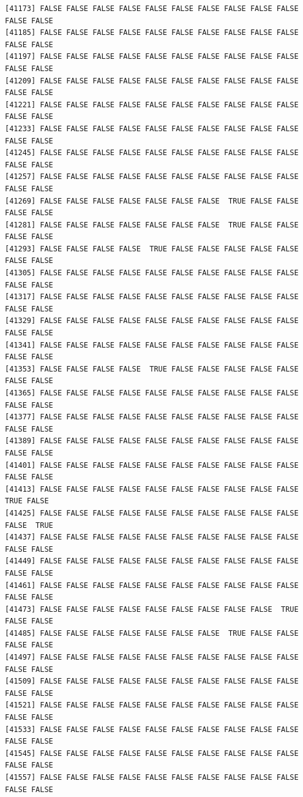 \documentclass[
  a4paper,
  DIV=11,
  numbers=noendperiod]{scrartcl}
\begin{document}
\begin{verbatim}
[41173] FALSE FALSE FALSE FALSE FALSE FALSE FALSE FALSE FALSE FALSE FALSE FALSE
[41185] FALSE FALSE FALSE FALSE FALSE FALSE FALSE FALSE FALSE FALSE FALSE FALSE
[41197] FALSE FALSE FALSE FALSE FALSE FALSE FALSE FALSE FALSE FALSE FALSE FALSE
[41209] FALSE FALSE FALSE FALSE FALSE FALSE FALSE FALSE FALSE FALSE FALSE FALSE
[41221] FALSE FALSE FALSE FALSE FALSE FALSE FALSE FALSE FALSE FALSE FALSE FALSE
[41233] FALSE FALSE FALSE FALSE FALSE FALSE FALSE FALSE FALSE FALSE FALSE FALSE
[41245] FALSE FALSE FALSE FALSE FALSE FALSE FALSE FALSE FALSE FALSE FALSE FALSE
[41257] FALSE FALSE FALSE FALSE FALSE FALSE FALSE FALSE FALSE FALSE FALSE FALSE
[41269] FALSE FALSE FALSE FALSE FALSE FALSE FALSE  TRUE FALSE FALSE FALSE FALSE
[41281] FALSE FALSE FALSE FALSE FALSE FALSE FALSE  TRUE FALSE FALSE FALSE FALSE
[41293] FALSE FALSE FALSE FALSE  TRUE FALSE FALSE FALSE FALSE FALSE FALSE FALSE
[41305] FALSE FALSE FALSE FALSE FALSE FALSE FALSE FALSE FALSE FALSE FALSE FALSE
[41317] FALSE FALSE FALSE FALSE FALSE FALSE FALSE FALSE FALSE FALSE FALSE FALSE
[41329] FALSE FALSE FALSE FALSE FALSE FALSE FALSE FALSE FALSE FALSE FALSE FALSE
[41341] FALSE FALSE FALSE FALSE FALSE FALSE FALSE FALSE FALSE FALSE FALSE FALSE
[41353] FALSE FALSE FALSE FALSE  TRUE FALSE FALSE FALSE FALSE FALSE FALSE FALSE
[41365] FALSE FALSE FALSE FALSE FALSE FALSE FALSE FALSE FALSE FALSE FALSE FALSE
[41377] FALSE FALSE FALSE FALSE FALSE FALSE FALSE FALSE FALSE FALSE FALSE FALSE
[41389] FALSE FALSE FALSE FALSE FALSE FALSE FALSE FALSE FALSE FALSE FALSE FALSE
[41401] FALSE FALSE FALSE FALSE FALSE FALSE FALSE FALSE FALSE FALSE FALSE FALSE
[41413] FALSE FALSE FALSE FALSE FALSE FALSE FALSE FALSE FALSE FALSE  TRUE FALSE
[41425] FALSE FALSE FALSE FALSE FALSE FALSE FALSE FALSE FALSE FALSE FALSE  TRUE
[41437] FALSE FALSE FALSE FALSE FALSE FALSE FALSE FALSE FALSE FALSE FALSE FALSE
[41449] FALSE FALSE FALSE FALSE FALSE FALSE FALSE FALSE FALSE FALSE FALSE FALSE
[41461] FALSE FALSE FALSE FALSE FALSE FALSE FALSE FALSE FALSE FALSE FALSE FALSE
[41473] FALSE FALSE FALSE FALSE FALSE FALSE FALSE FALSE FALSE  TRUE FALSE FALSE
[41485] FALSE FALSE FALSE FALSE FALSE FALSE FALSE  TRUE FALSE FALSE FALSE FALSE
[41497] FALSE FALSE FALSE FALSE FALSE FALSE FALSE FALSE FALSE FALSE FALSE FALSE
[41509] FALSE FALSE FALSE FALSE FALSE FALSE FALSE FALSE FALSE FALSE FALSE FALSE
[41521] FALSE FALSE FALSE FALSE FALSE FALSE FALSE FALSE FALSE FALSE FALSE FALSE
[41533] FALSE FALSE FALSE FALSE FALSE FALSE FALSE FALSE FALSE FALSE FALSE FALSE
[41545] FALSE FALSE FALSE FALSE FALSE FALSE FALSE FALSE FALSE FALSE FALSE FALSE
[41557] FALSE FALSE FALSE FALSE FALSE FALSE FALSE FALSE FALSE FALSE FALSE FALSE

\end{verbatim}
\end{document}
